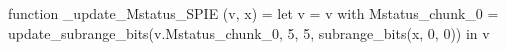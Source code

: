 function _update_Mstatus_SPIE (v, x) = let v = { v with Mstatus_chunk_0 = update_subrange_bits(v.Mstatus_chunk_0, 5, 5, subrange_bits(x, 0, 0)) } in
  v
